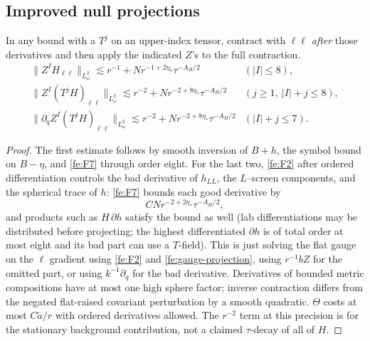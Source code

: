 \subsection{Improved null projections}\label{fe:projections}

\begin{lemma}\label{fe:null-projection}
In any bound with a \(T^j\) on an upper-index tensor, contract with \(\ell\ell\) \emph{after} those derivatives and then apply the indicated \(Z\)'s to the full contraction.
\begin{equation}\label{fe:F9}
\begin{array}{ll}
 \|Z^I H_{\ell\ell}\|_{L^2_\omega}
    \lesssim r^{-1}+N r^{-1+2\eta_*}\tau^{-A_H/2}&(|I|\le8),\\
 \|Z^I (T^j H)_{\ell\ell}\|_{L^2_\omega}
    \lesssim r^{-2}+N r^{-2+8\eta_*}\tau^{-A_H/2}
                                 &(j\ge1,\ |I|+j\le8),\\
 \|\partial_q Z^I (T^j H)_{\ell\ell}\|_{L^2_\omega}
    \lesssim r^{-2}+N r^{-2+8\eta_*}\tau^{-A_H/2}
                                 &(|I|+j\le7).
 \end{array}
\end{equation}
\end{lemma}

\begin{proof}
The first estimate follows by smooth inversion of $B+h$, the symbol
bound on $B-\eta$, and \eqref{fe:F7} through order eight.
For the last two, \eqref{fe:F2} after ordered differentiation controls the bad derivative of $h_{LL}$, the $L$--screen components, and the spherical trace of $h$: \eqref{fe:F7} bounds each good derivative by
\begin{equation*}
 C N r^{-2+2\eta_*}\tau^{-A_H/2},
\end{equation*} and products such as \(H\,\partial h\) satisfy the bound as well (lab differentiations may be distributed before projecting; the highest differentiated \(\partial h\) is of total order at most eight and its bad part can use a \(T\)-field). This is just solving the flat gauge on the \(\ell\) gradient using \eqref{fe:F2} and \eqref{fe:gauge-projection}, using \(r^{-1}b Z\) for the omitted part, or using \(k^{-1}\partial_q\) for the bad derivative. Derivatives of bounded metric compositions have at most one high sphere factor; inverse contraction differs from the negated flat-raised covariant perturbation by a smooth quadratic. \(\Theta\) costs at most \(C\widetilde a/r\) with ordered derivatives allowed. The \(r^{-2}\) term at this precision is for the stationary background contribution, not a claimed \(\tau\)-decay of all of \(H\).
\end{proof}

